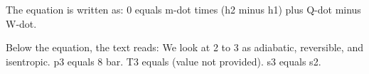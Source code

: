 The equation is written as:  
0 equals m-dot times (h2 minus h1) plus Q-dot minus W-dot.  

Below the equation, the text reads:  
We look at 2 to 3 as adiabatic, reversible, and isentropic.  
p3 equals 8 bar.  
T3 equals (value not provided).  
s3 equals s2.
